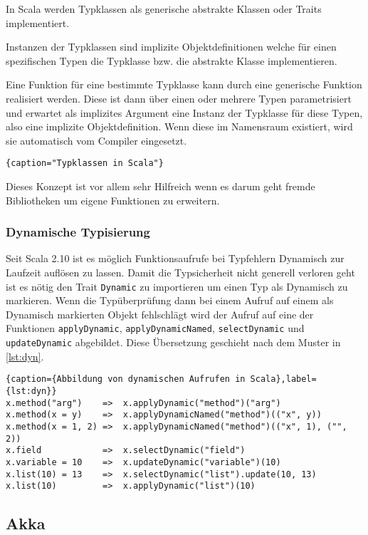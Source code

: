 In Scala werden Typklassen als generische abstrakte Klassen oder Traits  implementiert.

Instanzen der Typklassen sind implizite Objektdefinitionen welche für einen  spezifischen Typen die
Typklasse bzw. die abstrakte Klasse implementieren.

Eine Funktion für eine bestimmte Typklasse kann durch eine generische Funktion  realisiert werden.
Diese ist dann über einen oder mehrere Typen parametrisiert  und erwartet als implizites Argument
eine Instanz der Typklasse für diese Typen,  also eine implizite Objektdefinition. Wenn diese im
Namensraum existiert, wird  sie automatisch vom Compiler eingesetzt.

\begin{lstlisting}{caption="Typklassen in Scala"}
\end{lstlisting}

Dieses Konzept ist vor allem sehr Hilfreich wenn es darum geht fremde  Bibliotheken um eigene
Funktionen zu erweitern.

\subsubsection{Dynamische Typisierung}

Seit Scala 2.10 ist es möglich Funktionsaufrufe bei Typfehlern Dynamisch zur  Laufzeit auflösen zu
lassen. Damit die Typsicherheit nicht generell verloren  geht ist es nötig den Trait
\texttt{Dynamic} zu importieren um einen Typ als  Dynamisch zu markieren. Wenn die Typüberprüfung
dann bei einem Aufruf auf einem als Dynamisch markierten Objekt fehlschlägt wird der Aufruf auf eine
der Funktionen \texttt{applyDynamic}, \texttt{applyDynamicNamed}, \texttt{selectDynamic} und
\texttt{updateDynamic}  abgebildet. Diese Übersetzung geschieht nach dem Muster in \ref{lst:dyn}.

\begin{lstlisting}{caption={Abbildung von dynamischen Aufrufen in Scala},label={lst:dyn}}
x.method("arg")    =>  x.applyDynamic("method")("arg")
x.method(x = y)    =>  x.applyDynamicNamed("method")(("x", y))
x.method(x = 1, 2) =>  x.applyDynamicNamed("method")(("x", 1), ("", 2))
x.field            =>  x.selectDynamic("field")
x.variable = 10    =>  x.updateDynamic("variable")(10)
x.list(10) = 13    =>  x.selectDynamic("list").update(10, 13)
x.list(10)         =>  x.applyDynamic("list")(10)
\end{lstlisting}
 
\subsection{Akka}

